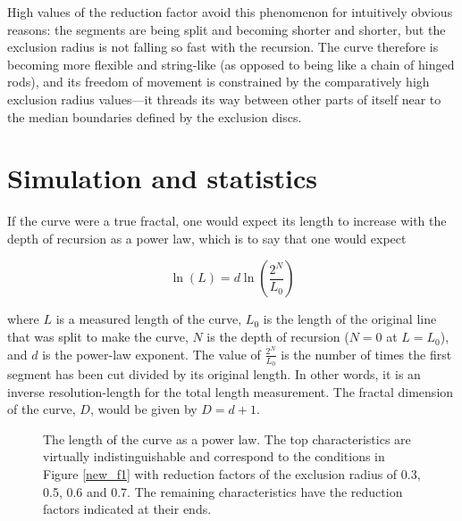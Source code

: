 \documentclass[12pt]{article}
\begin{document}
High values of the reduction factor avoid this phenomenon for
intuitively obvious reasons: the segments are being split and becoming
shorter and shorter, but the exclusion radius is not falling so fast
with the recursion.  The curve therefore is becoming more flexible and
string-like (as opposed to being like a chain of hinged rods),
and its freedom of movement is constrained by the comparatively high
exclusion radius values---it threads its way between other parts of
itself near to the median boundaries defined by the exclusion discs.

\section*{Simulation and statistics}

If the curve were a true fractal, one would expect its length to
increase with the depth of recursion as a power law, which is to say
that one would expect

$$
\ln (L) = d \ln (\frac{2^N}{L_0})
$$

\noindent
where $L$ is a measured length of the curve, $L_0$ is the length of
the original line that was split to make the curve, $N$ is the depth
of recursion ($N = 0$ at $L = L_0$), and $d$ is the power-law
exponent.  The value of $\frac{2^N}{L_0}$ is the number of times the
first segment has been cut divided by its original length.  In other
words, it is an inverse resolution-length for the total length
measurement.  The fractal dimension of the curve, $D$, would be given
by $D = d + 1$.

\begin{figure}[h!]
 \begin{center} 
  \parbox{110mm}{\caption{\label{fd} The length of the curve as a
    power law.  The top characteristics are virtually
    indistinguishable and correspond to the conditions in Figure
    \ref{new_f1} with reduction factors of the exclusion radius of
    0.3, 0.5, 0.6 and 0.7.  The remaining characteristics have the
    reduction factors indicated at their ends.}}
\end{center}
\end{figure}
\end{document}
